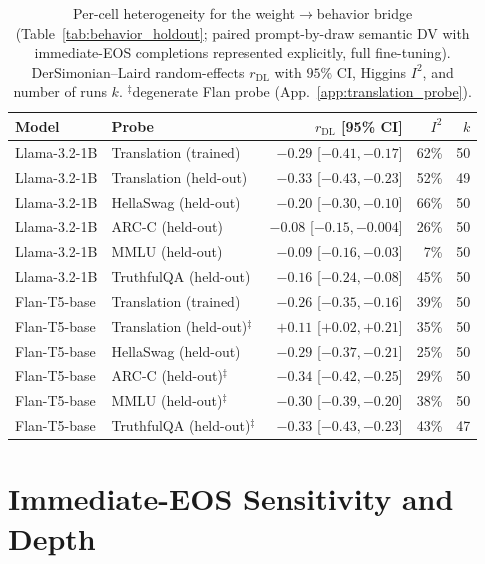 \documentclass{article}
\theoremstyle{definition}
\theoremstyle{plain}
\begin{document}
\begin{table}[h]
\caption{Per-cell heterogeneity for the weight$\to$behavior bridge (Table~\ref{tab:behavior_holdout};
  paired prompt-by-draw semantic DV with immediate-EOS completions represented explicitly, full fine-tuning).
  DerSimonian--Laird random-effects $r_{\mathrm{DL}}$ with $95\%$ CI, Higgins $I^2$,
  and number of runs $k$. $^\ddagger$degenerate Flan probe (App.~\ref{app:translation_probe}).}
\label{tab:behavior_het}
\begin{center}
\small
\begin{tabular}{llrrr}
\toprule
Model & Probe & $r_{\mathrm{DL}}$ [95\% CI] & $I^2$ & $k$ \\
\midrule
Llama-3.2-1B & Translation (trained)              & $-0.29$ [$-0.41,-0.17$] & 62\% & 50 \\
Llama-3.2-1B & Translation (held-out)             & $-0.33$ [$-0.43,-0.23$] & 52\% & 49 \\
Llama-3.2-1B & HellaSwag (held-out)               & $-0.20$ [$-0.30,-0.10$] & 66\% & 50 \\
Llama-3.2-1B & ARC-C (held-out)                   & $-0.08$ [$-0.15,-0.004$] & 26\% & 50 \\
Llama-3.2-1B & MMLU (held-out)                    & $-0.09$ [$-0.16,-0.03$] & 7\% & 50 \\
Llama-3.2-1B & TruthfulQA (held-out)              & $-0.16$ [$-0.24,-0.08$] & 45\% & 50 \\
Flan-T5-base & Translation (trained)              & $-0.26$ [$-0.35,-0.16$] & 39\% & 50 \\
Flan-T5-base & Translation (held-out)$^\ddagger$  & $+0.11$ [$+0.02,+0.21$] & 35\% & 50 \\
Flan-T5-base & HellaSwag (held-out)               & $-0.29$ [$-0.37,-0.21$] & 25\% & 50 \\
Flan-T5-base & ARC-C (held-out)$^\ddagger$         & $-0.34$ [$-0.42,-0.25$] & 29\% & 50 \\
Flan-T5-base & MMLU (held-out)$^\ddagger$          & $-0.30$ [$-0.39,-0.20$] & 38\% & 50 \\
Flan-T5-base & TruthfulQA (held-out)$^\ddagger$    & $-0.33$ [$-0.43,-0.23$] & 43\% & 47 \\
\bottomrule
\end{tabular}
\end{center}
\end{table}


\section{Immediate-EOS Sensitivity and Depth}
\label{app:empty-sensitivity}
\end{document}
